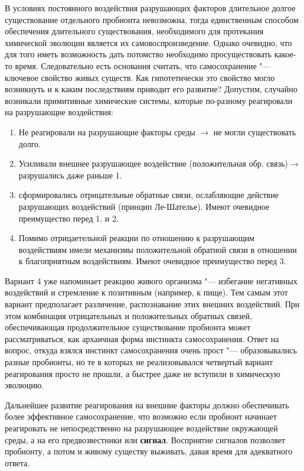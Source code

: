 \documentclass[12pt,a4paper,oneside]{book}
\begin{document}
В условиях постоянного воздействия разрушающих факторов длительное долгое существование отдельного пробионта невозможна, тогда единственным способом обеспечения длительного существования, необходимого для протекания химической эволюции является их самовоспроизведение.  Однако очевидно, что для того иметь возможность дать потомство необходимо просуществовать какое-то время. Следовательно есть основания считать, что самосохранение "--- ключевое свойство живых существ. Как гипотетически это свойство могло возникнуть и к каким последствиям приводит его развитие? 
Допустим, случайно возникали примитивные химические системы, которые по-разному реагировали на разрушающие воздействия:

\begin{enumerate}
\item Не реагировали на разрушающие факторы среды $\longrightarrow$ не могли существовать долго.
\item Усиливали внешнее разрушающее воздействие (положительная обр. связь)$\longrightarrow$ разрушались даже раньше 1.
\item сформировались отрицательные обратные связи, ослабляющие действие разрушающих воздействий (принцип Ле-Шателье). Имеют очевидное преимущество перед 1. и 2.
\item Помимо отрицаетельной реакции по отношению к разрушающим воздействиям имели механизмы положительной обратной связи в отношении к благоприятным воздействиям. Имеют очевидное преимущество перед 3.
\end{enumerate}

Вариант 4 уже напоминает реакцию живого организма "--- избегание негативных воздействий и стремление к позитивным (например, к пище). Тем самым этот вариант предполагает различение, распознавание этих внешних воздействий. При этом комбинация отрицательных и положительных обратных связей, обеспечивающая продолжительное существование пробионта может рассматриваться, как архаичная форма инстинкта самосохранения. Ответ на вопрос, откуда взялся инстинкт самосохранения очень прост "--- образовывались разные пробионты, но те в которых не реализовывался четвертый вариант реагирования просто не прошли, а быстрее даже не вступили в химическую эволюцию.  

Дальнейшее развитие реагирования на внешние факторы должно обеспечивать более эффективное самосохранение, что возможно если пробионт начинает реагировать не непосредственно на разрушающее воздействие окружающей среды, а на его предвозвестники или \textbf{сигнал}. Восприятие сигналов позволяет пробионту, а потом и живому существу выживать, давая время для адекватного ответа.
\end{document}
